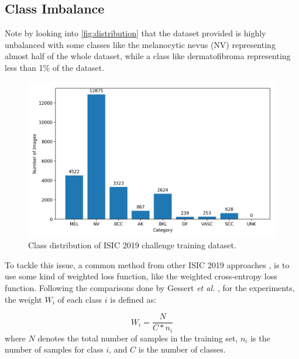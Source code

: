 \subsection{Class Imbalance}
\label{subsection:imbalance}

    Note by looking into \autoref{fig:distribution} that the dataset provided is highly unbalanced with some classes like the melanocytic nevus (NV) representing almost half of the whole dataset, while a class like dermatofibroma representing less than 1\% of the dataset. \par
    
    \begin{figure}[h!]
      \includegraphics[width=\textwidth,keepaspectratio]{figs/training_data_distribution.jpg}
      \caption{Class distribution of \ac{ISIC} 2019 challenge training dataset.}
      \label{fig:distribution}
    \end{figure}

    To tackle this issue, a common method from other \ac{ISIC} 2019 approaches \cite{isic2019first}\cite{isic2019second}\cite{Wang}, is to use some kind of weighted loss function, like the weighted cross-entropy loss function. Following the comparisons done by Gessert \textit{et al.} \cite{gessert2018}, for the experiments, the weight $W_i$ of each class $i$ is defined as: \par

    \begin{equation}
        W_i=\frac{N}{C*n_i}
        \label{eq:class_weights}
    \end{equation}
    where $N$ denotes the total number of samples in the training set, $n_i$ is the number of samples for class $i$, and $C$ is the number of classes. \par

